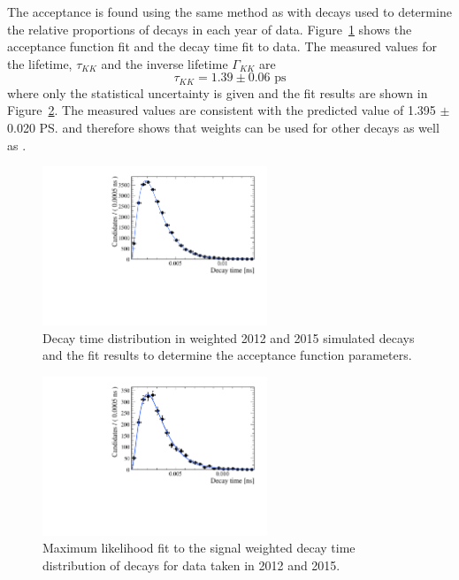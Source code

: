 The \bskk acceptance is found using the same method as \bsmumu with \bsjpisphi decays used to determine the relative proportions of decays in each year of data. Figure~\ref{fig:bskkacceptancefit} shows the acceptance function fit and the decay time fit to data. The measured values for the lifetime, $\tau_{KK}$ and the inverse lifetime $\Gamma_{KK}$ are
\begin{equation}
\tau_{KK} = 1.39 \pm 0.06  \text{ ps} 
\end{equation}
where only the statistical uncertainty is given and the fit results are shown in Figure~\ref{fig:bskklifetimefit}. The measured values are consistent with the predicted value of 1.395 $\pm$ 0.020 \ps \cite{} and therefore shows that \bdkpi weights can be used for other decays as well as \bdkpi. 

\begin{figure}[htbp]
\centering
  \includegraphics[width=0.6\textwidth]{./Figs/LifetimeSystematics/Bs2KK_acceptance_Fit.pdf}
\caption{Decay time distribution in weighted 2012 and 2015 simulated decays and the \ml fit results to determine the acceptance function parameters. }
\label{fig:bskkacceptancefit}
\end{figure}

\begin{figure}[htbp]
\centering
  \includegraphics[width=0.6\textwidth]{./Figs/LifetimeSystematics/Bd2KPi_lifetime_fit.pdf}
\caption{Maximum likelihood fit to the signal weighted decay time distribution of \bskk decays for data taken in  2012 and 2015. }
\label{fig:bskklifetimefit}
\end{figure}

